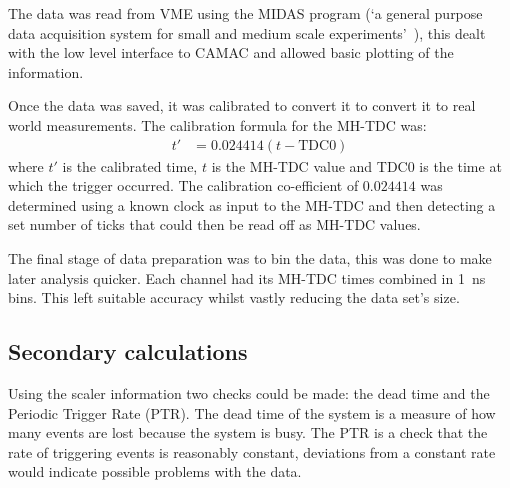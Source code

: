 The data was read from VME using the MIDAS program (`a general purpose data acquisition system for small and medium scale experiments'~\cite{midas_daq}), this dealt with the low level interface to CAMAC and allowed basic plotting of the information.

Once the data was saved, it was calibrated to convert it to convert it to real world measurements. The calibration formula for the MH-TDC was:
\begin{align}\label{equ:tdc_calibration}
    t'   &= 0.024414(t - \text{TDC0})
\end{align}
where \(t'\) is the calibrated time, \(t\) is the MH-TDC value and TDC0 is the time at which the trigger occurred. The calibration co-efficient of \(0.024414\) was determined using a known clock as input to the MH-TDC and then detecting a set number of ticks that could then be read off as MH-TDC values.

The final stage of data preparation was to bin the data, this was done to make later analysis quicker. Each channel had its MH-TDC times combined in 1~ns bins. This left suitable accuracy whilst vastly reducing the data set's size.

\subsection{Secondary calculations} %
\label{sec:secondary_calculations}
Using the scaler information two checks could be made: the dead time and the Periodic Trigger Rate (PTR). The dead time of the system is a measure of how many events are lost because the system is busy. The PTR is a check that the rate of triggering events is reasonably constant, deviations from a constant rate would indicate possible problems with the data.

